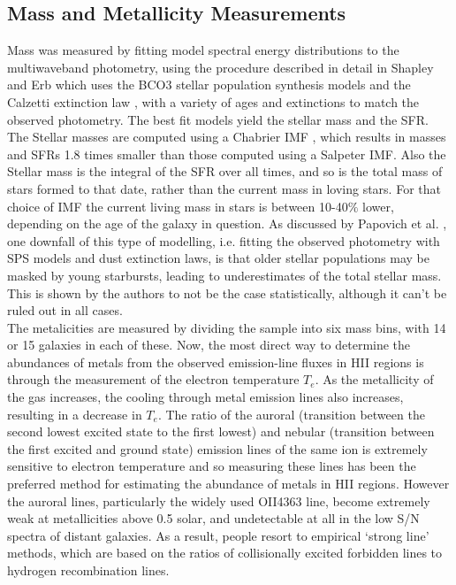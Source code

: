 \documentclass{literature}
\begin{document}
\subsection{Mass and Metallicity Measurements}
Mass was measured by fitting model spectral energy distributions to the multiwaveband photometry, using the procedure described in detail in Shapley \citep{Shapley_2005} and Erb \citep{Erb_2006a} which uses the BCO3 \citep{Bruzual2003} stellar population synthesis models and the Calzetti extinction law \citep{Calzetti2000}, with a variety of ages and extinctions to match the observed photometry. The best fit models yield the stellar mass and the SFR. The Stellar masses are computed using a Chabrier IMF \citep{Chabrier2003}, which results in masses and SFRs 1.8 times smaller than those computed using a Salpeter IMF. Also the Stellar mass is the integral of the SFR over all times, and so is the total mass of stars formed to that date, rather than the current mass in loving stars. For that choice of IMF the current living mass in stars is between 10-40$\%$
lower, depending on the age of the galaxy in question. As discussed by Papovich et al. \citep{Papovich2001}, one downfall of this type of modelling, i.e. fitting the observed photometry with SPS models and dust extinction laws, is that older stellar populations may be masked by young starbursts, leading to underestimates of the total stellar mass. This is shown by the authors to not be the case statistically, although it can't be ruled out in all cases. \\ 
The metalicities are measured by dividing the sample into six mass bins, with 14 or 15 galaxies in each of these. Now, the most direct way to determine the abundances of metals from the observed emission-line fluxes in HII regions is through the measurement of the electron temperature $T_{e}$. As the metallicity of the gas increases, the cooling through metal emission lines also increases, resulting in a decrease in $T_{e}$. The ratio of the auroral (transition between the second lowest excited state to the first lowest) and nebular (transition between the first excited and ground state) emission lines of the same ion is extremely sensitive to electron temperature and so measuring these lines has been the preferred method for estimating the abundance of metals in HII regions. However the auroral lines, particularly the widely used OII4363 line, become extremely weak at metallicities above 0.5 solar, and undetectable at all in the low S/N spectra of distant galaxies. As a result, people resort to empirical `strong line' methods, which are based on the ratios of collisionally excited forbidden lines to hydrogen recombination lines. \\ 
\end{document}
